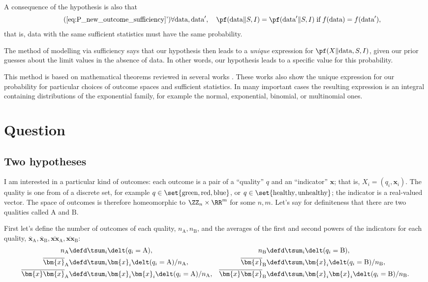\documentclass[10pt,%
onecolumn,oneside,a5paper,article,frenchb,italian,german,swedish,latin,british%
]{memoir}
\newcommand*{\te}{}
\newcommand*{\yxn}{X}
\newcommand*{\yI}{I}
\newcommand*{\yS}{S}
\newcommand*{\data}{\textrm{data}}
\newcommand*{\yf}{f}
\newcommand*{\yh}{q}
\newcommand*{\bx}{\bm{x}}
\newcommand*{\ya}{\textrm{A}}
\newcommand*{\yb}{\textrm{B}}
\newcommand*{\yna}{n_{\ya}}
\newcommand*{\ynb}{n_{\yb}}
\newcommand*{\yxa}{\overline{\bx}_{\ya}}
\newcommand*{\yxb}{\overline{\bx}_{\yb}}
\newcommand*{\yxxa}{\overline{\bx\te\bx}_{\ya}}
\newcommand*{\yxxb}{\overline{\bx\te\bx}_{\yb}}
\begin{document}
A consequence of the hypothesis is also that
\begin{equation}
  \label{eq:P_different_data_sufficiency}
  \tag*{(\ref{eq:P_new_outcome_sufficiency}')}
\forall\data,\data',\quad  \pf(\data \| \yS, \yI) = \pf(\data' \| \yS, \yI)
\;  \text{if} \; \yf(\data)=\yf(\data'),
\end{equation}
that is, data with the same sufficient statistics must have the same
probability.

The method of modelling via sufficiency says that our hypothesis then leads
to a \emph{unique} expression for $\pf(\yxn \| \data, \yS, \yI)$, given our
prior guesses about the limit values in the absence of data. In other
words, our hypothesis leads to a specific value for this probability.

This method is based on mathematical theorems reviewed in several works
\cites[\eg:][]{dawid2013,diaconis1992}[\sect~4.5]{bernardoetal1994_r2000}{kallenberg2005,lauritzen1982_r1988,diaconisetal1981}.
These works also show the unique expression for our probability for
particular choices of outcome spaces and sufficient statistics. In many
important cases the resulting expression is an integral containing
distributions of the exponential family, for example the normal, exponential,
binomial, or multinomial ones.


\section{Question}
\label{sec:question}

\subsection{Two hypotheses}
\label{sec:two_hypotheses}

I am interested in a particular kind of outcomes: each outcome is a pair of
a \enquote{quality} $\yh$ and an \enquote{indicator} $\bx$; that is,
$X_i=(\yh_i,\bx_i)$. The quality is one from of a discrete set, for example
$\yh \in \set{\textrm{green}, \textrm{red}, \textrm{blue}}$, or
$\yh \in \set{\textrm{healthy}, \textrm{unhealthy}}$; the indicator is a
real-valued vector. The space of outcomes is therefore homeomorphic to
$\ZZ_n\times\RR^m$ for some $n,m$. Let's say for definiteness that there
are two qualities called $\ya$ and $\yb$.

First let's define the number of outcomes of each quality, $\yna,\ynb$, and
the averages of the first and second powers of the indicators for each
quality, $\yxa,\yxb,\yxxa, \yxxb$:
\begin{equation}
  \label{eq:suff_stat_1}
  \begin{aligned}
      \yna&\defd \tsum_i\delt(\yh_i=\ya),
&
      \ynb&\defd \tsum_i\delt(\yh_i=\yb),
\\
\yxa&\defd \tsum_i \bx_i\delt(\yh_i=\ya)/\yna,
&
\yxb&\defd \tsum_i \bx_i\delt(\yh_i=\yb)/\ynb,
\\
\yxxa&\defd \tsum_i {\bx_i}\te\bx_i\delt(\yh_i=\ya)/\yna,
&
      \yxxb&\defd \tsum_i {\bx_i}\te\bx_i\delt(\yh_i=\yb)/\ynb.
  \end{aligned}
\end{equation}
  
\end{document}
